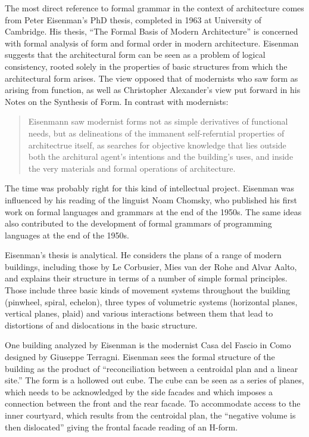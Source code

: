 The most direct reference to formal grammar in the context of architecture comes
from Peter Eisenman's PhD thesis, completed in 1963 at University of Cambridge. His thesis,
``The Formal Basis of Modern Architecture'' is concerned with formal analysis of
form and formal order in modern architecture. Eisenman suggests that the architectural form
can be seen as a problem of logical consistency, rooted solely in the properties of basic
structures from which the architectural form arises. The view opposed that of modernists who saw
form as arising from function, as well as Christopher Alexander's view put forward in his
Notes on the Synthesis of Form. In contrast with modernists:

\begin{quote}
Eisenmann saw modernist forms not as simple derivatives of functional needs, but as
delineations of the immanent self-referntial properties of architectrue itself,
as searches for objective knowledge that lies outside both the architural agent's intentions
and the building's uses, and inside the very materials and formal operations of
architecture.
\end{quote}

The time was probably right for this kind of intellectual project.
Eisenman was influenced by his reading of the linguist Noam Chomsky,
who published his first work on formal languages and grammars at the end of the 1950s. The
same ideas also contributed to the development of formal grammars of programming languages at
the end of the 1950s.

Eisenman's thesis is analytical. He considers the plans of a range of modern buildings,
including those by Le Corbusier, Mies van der Rohe and Alvar Aalto, and explains their
structure in terms of a number of simple formal principles. Those include three basic
kinds of movement systems throughout the building (pinwheel, spiral, echelon), three types
of volumetric systems (horizontal planes, vertical planes, plaid) and various interactions
between them that lead to distortions of and dislocations in the basic structure.

One building analyzed by Eisenman is the modernist Casa del Fascio in Como designed by
Giuseppe Terragni. Eisenman sees the formal structure of the building as the product of
``reconciliation between a centroidal plan and a linear site.''
The form is a hollowed out cube. The cube can be seen as a series of planes, which needs
to be acknowledged by the side facades and which imposes a connection between the front and
the rear facade. To accommodate access to the inner courtyard, which results from the centroidal
plan, the ``negative volume is then dislocated'' giving the frontal facade reading of
an H-form.

